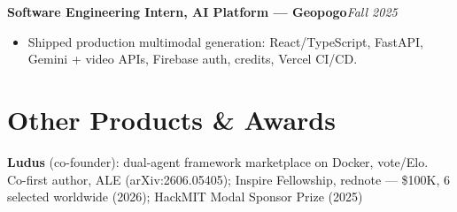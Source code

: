 \documentclass[10pt, letterpaper]{article}
\newcommand{\role}[2]{%
  \vspace{3pt}%
  \noindent\textbf{#1}\hfill\textit{#2}\par
}
\begin{document}
\role{Software Engineering Intern, AI Platform --- Geopogo}{Fall 2025}
\begin{itemize}
  \item Shipped production multimodal generation: React/TypeScript, FastAPI, Gemini + video APIs, Firebase auth, credits, Vercel CI/CD.
\end{itemize}

\section{Other Products \& Awards}
\textbf{Ludus} (co-founder): dual-agent framework marketplace on Docker, vote/Elo.\\[1pt]
Co-first author, ALE (arXiv:2606.05405); Inspire Fellowship, rednote --- \$100K, 6 selected worldwide (2026); HackMIT Modal Sponsor Prize (2025)
\end{document}
